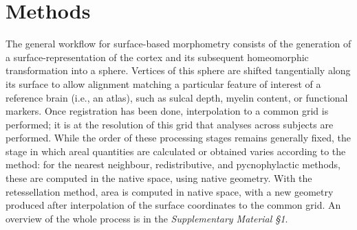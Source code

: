 \section{Methods}
\label{sec:method}

The general workflow for surface-based morphometry consists of the generation of a surface-representation of the cortex and its subsequent homeomorphic transformation into a sphere. Vertices of this sphere are shifted tangentially along its surface to allow alignment matching a particular feature of interest of a reference brain (i.e., an atlas), such as sulcal depth, myelin content, or functional markers. Once registration has been done, interpolation to a common grid is performed; it is at the resolution of this grid that analyses across subjects are performed. While the order of these processing stages remains generally fixed, the stage in which areal quantities are calculated or obtained varies according to the method: for the nearest neighbour, redistributive, and pycnophylactic methods, these are computed in the native space, using native geometry. With the retessellation method, area is computed in native space, with a new geometry produced after interpolation of the surface coordinates to the common grid. An overview of the whole process is in the \emph{Supplementary Material §1}.

